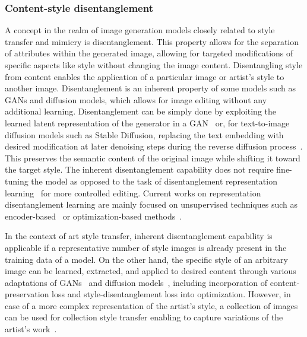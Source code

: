\documentclass[conference]{IEEEtran}
\begin{document}
\subsubsection{Content-style disentanglement}
A concept in the realm of image generation models closely related to style transfer and mimicry is disentanglement. This property allows for the separation of attributes within the generated image, allowing for targeted modifications of specific aspects like style without changing the image content. Disentangling style from content enables the application of a particular image or artist's style to another image.
Disentanglement is an inherent property of some models such as GANs and diffusion models, which allows for image editing without any additional learning. Disentanglement can be simply done by exploiting the learned latent representation of the generator in a GAN~\cite{collins_editing_2020, harkonen_ganspace_2020} or, for text-to-image diffusion models such as Stable Diffusion, replacing the text embedding with desired modification at later denoising steps during the reverse diffusion process~\cite{wu_uncovering_2023}. This preserves the semantic content of the original image while shifting it toward the target style. The inherent disentanglement capability does not require fine-tuning the model as opposed to the task of disentanglement representation learning~\cite{higgins_towards_2018} for more controlled editing. 
Current works on representation disentanglement learning are mainly focused on unsupervised techniques such as encoder-based~\cite{yang_disdiff_2023} or optimization-based methods~\cite{wang_stylediffusion_2023, kwon_diffusion-based_2023}. %

In the context of art style transfer, inherent disentanglement capability is applicable if a representative number of style images is already present in the training data of a model. On the other hand, the specific style of an arbitrary image can be learned, extracted, and applied to desired content through various adaptations of GANs~\cite{kazemi_style_2018} and diffusion models~\cite{wang_stylediffusion_2023}, including incorporation of content-preservation loss and style-disentanglement loss into optimization. However, in case of a more complex representation of the artist's style, a collection of images can be used for collection style transfer enabling to capture variations of the artist's work~\cite{kotovenko_content_2019, xu_drb-gan_2021}.
\end{document}
